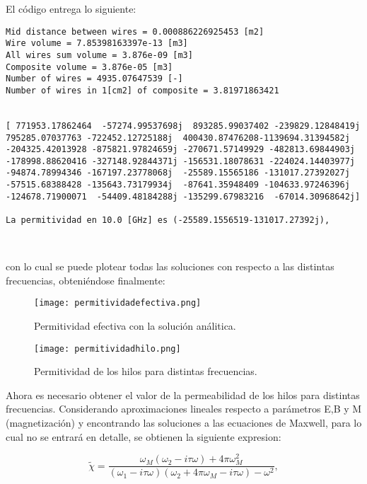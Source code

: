 \documentclass[12pt,letterpaper]{article}
\numberwithin{equation}{section}
\begin{document}
El código entrega lo siguiente:

\begin{lstlisting}
Mid distance between wires = 0.000886226925453 [m2]
Wire volume = 7.85398163397e-13 [m3]
All wires sum volume = 3.876e-09 [m3]
Composite volume = 3.876e-05 [m3]
Number of wires = 4935.07647539 [-]
Number of wires in 1[cm2] of composite = 3.81971863421


[ 771953.17862464  -57274.99537698j  893285.99037402 -239829.12848419j
795285.07037763 -722452.12725188j  400430.87476208-1139694.31394582j
-204325.42013928 -875821.97824659j -270671.57149929 -482813.69844903j
-178998.88620416 -327148.92844371j -156531.18078631 -224024.14403977j
-94874.78994346 -167197.23778068j  -25589.15565186 -131017.27392027j
-57515.68388428 -135643.73179934j  -87641.35948409 -104633.97246396j
-124678.71900071  -54409.48184288j -135299.67983216  -67014.30968642j]

La permitividad en 10.0 [GHz] es (-25589.1556519-131017.27392j),



\end{lstlisting}

\noindent con lo cual se puede plotear todas las soluciones con respecto a las distintas frecuencias, obteniéndose finalmente:

\begin{figure}[H]
	\centering\texttt{[image: permitividadefectiva.png]}\\
	\caption{Permitividad efectiva con la solución análitica.}
	\label{fig:permitividadefectiva}
\end{figure} 



\begin{figure}[H]
	\centering\texttt{[image: permitividadhilo.png]}\\
	\caption{Permitividad de los hilos para distintas frecuencias.}
	\label{fig:permitividadhilo}
\end{figure} 

Ahora es necesario obtener el valor de la permeabilidad de los hilos para distintas frecuencias. Considerando aproximaciones lineales respecto a parámetros E,B y M (magnetización) y encontrando las soluciones a las ecuaciones de Maxwell, para lo cual no se entrará en detalle, se obtienen la siguiente expresion:

\begin{equation}
	\tilde{\chi}=\frac{\omega_M(\omega_2-i\tau\omega)+4\pi\omega^2_M}{(\omega_1-i\tau\omega)(\omega_2+4\pi\omega_M-i\tau\omega)-\omega^2},
\end{equation}
\end{document}

